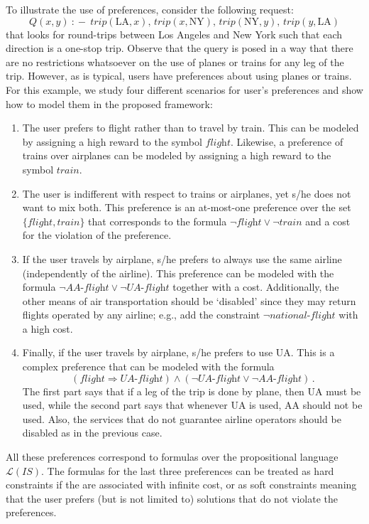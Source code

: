 \documentclass{llncs}
\newcommand{\qrule}{:\!\!-}
\renewcommand{\L}{\mathcal{L}}
\newcommand{\trip}{\textit{trip}}
\newcommand{\AAflight}{\textit{AA-flight}}
\newcommand{\UAflight}{\textit{UA-flight}}
\newcommand{\flight}{\textit{flight}}
\newcommand{\train}{\textit{train}}
\renewcommand{\AA}{\text{AA}}
\newcommand{\UA}{\text{UA}}
\newcommand{\NY}{\text{NY}}
\newcommand{\LA}{\text{LA}}
\newcommand{\nationalFlight}{\textit{national-flight}}
\begin{document}
To illustrate the use of preferences, consider the following request:
\[ Q(x,y)\ \qrule\ \trip(\LA,x),\,\trip(x,\NY),\,\trip(\NY,y),\,\trip(y,\LA) \]
that looks for round-trips between Los Angeles and New York such that
each direction is a one-stop trip. Observe that the query is posed in 
a way that there are no restrictions whatsoever on the use of planes or
trains for any leg of the trip. However, as is typical, users have 
preferences about using planes or trains.
For this example, we study four different scenarios for user's preferences
and show how to model them in the proposed framework:
\begin{enumerate}[P1.]
\item The user prefers to flight rather than to travel by train. This can be
      modeled by assigning a high reward to the symbol $\flight$. Likewise, a
      preference of trains over airplanes can be modeled by assigning a high
      reward to the symbol $\train$.
\item The user is indifferent with respect to trains or airplanes, yet
      s/he does not want to mix both. This preference is an at-most-one preference
      over the set $\{\flight,\train\}$ that corresponds to the formula
      $\neg\flight \lor \neg\train$ and a cost for the violation of the
      preference.
\item If the user travels by airplane, s/he prefers to always use the same
      airline (independently of the airline). This preference can be modeled
      with the formula $\neg\AAflight \lor \neg\UAflight$ together with a
      cost. Additionally, the other means of air transportation should be
      `disabled' since they may return flights operated by any airline;
      e.g., add the constraint $\neg\nationalFlight$ with a high cost.
\item Finally, if the user travels by airplane, s/he prefers to use $\UA$.
      This is a complex preference that can be modeled with the formula
\[ (\flight \Rightarrow \UAflight) \land (\neg\UAflight \lor \neg\AAflight)\,. \]
      The first part says that if a leg of the trip is done by plane, then $\UA$
      must be used, while the second part says that whenever $\UA$ is used,
      $\AA$ should not be used. Also, the services that do not guarantee
      airline operators should be disabled as in the previous case.
\end{enumerate}
All these preferences correspond to formulas over the propositional language
$\L(IS)$. The formulas for the last three preferences can be treated as
hard constraints if the are associated with infinite cost, or as soft
constraints meaning that the user prefers (but is not limited to) solutions
that do not violate the preferences.
\end{document}
